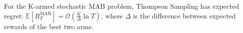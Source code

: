 

 


\begin{lemma}
	\label{lem:ts}
For the K-armed stochastic MAB problem, Thompson Sampling has expected regret:
$\mathbb{E}[R_T^{\text{MAB}}] = \mathcal{O}\left(\frac{K}{\Delta}\ln T \right)$, where $\Delta$ is the difference between expected rewards of the best two arms.
\end{lemma}




